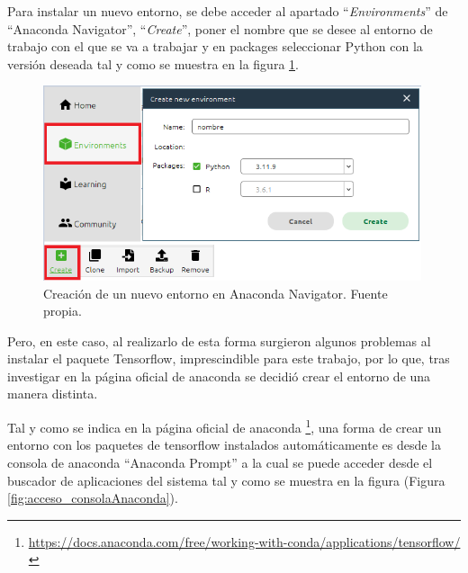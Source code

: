     Para instalar un nuevo entorno, se debe acceder al apartado ``\textit{Environments}'' de ``Anaconda Navigator'', ``\textit{Create}'', poner el nombre que se desee al entorno de trabajo con el que se va a trabajar y en packages seleccionar Python con la versión deseada tal y como se muestra en la figura \ref{fig:creacion_entorno}.
    
    \begin{figure}[h]
        \centering
        \includegraphics[width=0.99\textwidth]{img/creacion_entorno.PNG}
        \caption{Creación de un nuevo entorno en Anaconda Navigator. Fuente propia.}
        \label{fig:creacion_entorno}
    \end{figure}
    \FloatBarrier
    
    Pero, en este caso, al realizarlo de esta forma surgieron algunos problemas al instalar el paquete Tensorflow, imprescindible para este trabajo, por lo que, tras investigar en la página oficial de anaconda se decidió crear el entorno de una manera distinta. 
    
    Tal y como se indica en la página oficial de anaconda \footnote{\url{https://docs.anaconda.com/free/working-with-conda/applications/tensorflow/}}, una forma de crear un entorno con los paquetes de tensorflow instalados automáticamente es desde la consola de anaconda ``Anaconda Prompt'' a la cual se puede acceder desde el buscador de aplicaciones del sistema tal y como se muestra en la figura (Figura \ref{fig:acceso_consolaAnaconda}).
    
